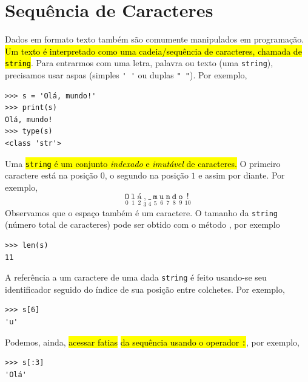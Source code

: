 \section{Sequência de Caracteres}\label{cap_lingua_sec_string}

Dados em formato texto também são comumente manipulados em programação. \hl{Um texto é interpretado como uma cadeia/sequência de caracteres, chamada de \texttt{string}}. Para entrarmos com uma letra, palavra ou texto (uma \texttt{string}), precisamos usar aspas (simples \lstinline+' '+ ou duplas \lstinline+" "+). Por exemplo,

\begin{lstlisting}
>>> s = 'Olá, mundo!'
>>> print(s)
Olá, mundo!
>>> type(s)
<class 'str'>
\end{lstlisting}

Uma \hl{\texttt{string} é um conjunto \emph{indexado} e \emph{imutável} de caracteres.} O primeiro caractere está na posição $0$, o segundo na posição $1$ e assim por diante. Por exemplo,
\begin{equation}
  \underset{0}{\texttt{O}}~\underset{1}{\texttt{l}}~\underset{2}{\texttt{á}}~\underset{3}{\texttt{,}}~\underset{4}{\texttt{\_}}~\underset{5}{\texttt{m}}~\underset{6}{\texttt{u}}~\underset{7}{\texttt{n}}~\underset{8}{\texttt{d}}~\underset{9}{\texttt{o}}~\underset{10}{\texttt{!}}
\end{equation}
Observamos que o espaço também é um caractere. O tamanho da \texttt{string} (número total de caracteres) pode ser obtido com o método {\PYTHONlen}, por exemplo

\begin{lstlisting}
>>> len(s)
11
\end{lstlisting}

A referência a um caractere de uma dada \texttt{string} é feito usando-se seu identificador seguido do índice de sua posição entre colchetes. Por exemplo,

\begin{lstlisting}
>>> s[6]
'u'
\end{lstlisting}

Podemos, ainda, \hl{acessar fatias}\hl{ da sequência usando o operador \texttt{:}}, por exemplo,

\begin{lstlisting}
>>> s[:3]
'Olá'
\end{lstlisting}

